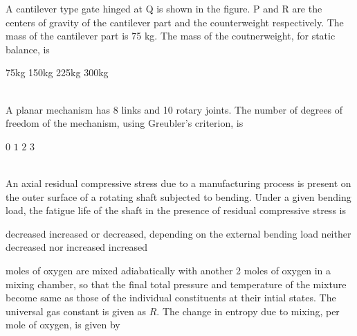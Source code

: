\documentclass[addpoints,11pt]{exam}
\begin{document}
\begin{questions}
    \question A cantilever type gate hinged at Q is shown in the figure. P and R are the centers of gravity of the cantilever part and the counterweight respectively. The mass of the cantilever part is 75 kg. The mass of the coutnerweight, for static balance, is\\


    \begin{oneparchoices}
        \choice 75kg
        \choice 150kg
        \choice 225kg
        \choice 300kg
    \end{oneparchoices}\\

    \question A planar mechanism has 8 links and 10 rotary joints. The number of degrees of freedom of the mechanism, using Greubler's criterion, is\\

    \begin{oneparchoices}
        \choice $0$
        \choice $1$
        \choice $2$
        \choice $3$
    \end{oneparchoices}\\

    \question An axial residual compressive stress due to a manufacturing process is present on the outer surface of a rotating shaft subjected to bending. Under a given bending load, the fatigue life of the shaft in the presence of residual compressive stress is\\

    \begin{choices}
        \choice decreased
        \choice increased or decreased, depending on the external bending load
        \choice neither decreased nor increased
        \choice increased
    \end{choices}

     moles of oxygen are mixed adiabatically with another 2 moles of oxygen in a mixing chamber, so that the final total pressure and temperature of the mixture become same as those of the individual constituents at their intial states. The universal gas constant is given as $R$. The change in entropy due to mixing, per mole of oxygen, is given by\\


\end{questions}
\end{document}
